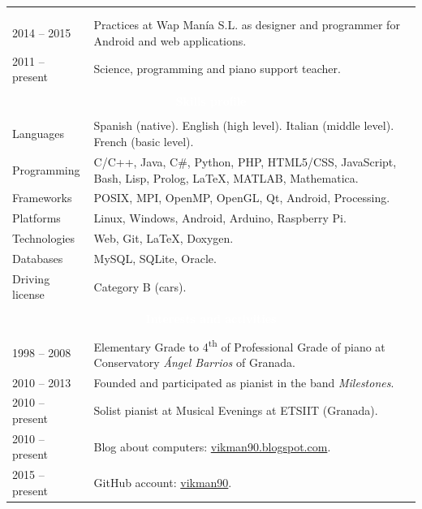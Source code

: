 \documentclass[12pt,a4paper]{article}
\newcommand{\header}[1]{\multicolumn{2}{c}{\cellcolor{black} \textcolor{white} {#1}} \\}
\begin{document}
\begin{longtable}{p{}p{}}
		\begin{tabular}{p{}p{}}
		\header{\textbf{Work experience}}
		\\
		2014 -- 2015 & Practices at Wap Manía S.L. as designer and programmer 
		for Android and web applications. \\	
		2011 -- present & Science, programming and piano support teacher. \\
		\\
		\header{\textbf{Skills profile}}
		\\
		Languages & Spanish (native). \newline
		English (high level). \newline
		Italian (middle level). \newline
		French (basic level). \\
		Programming & C/C++, Java, C\#, Python, PHP, HTML5/CSS, JavaScript, 
		Bash, Lisp, Prolog, LaTeX, MATLAB, Mathematica. \\
		Frameworks & POSIX, MPI, OpenMP, OpenGL, Qt, Android, Processing. \\
		Platforms & Linux, Windows, Android, Arduino, Raspberry Pi. \\
		Technologies & Web, Git, LaTeX, Doxygen. \\
		Databases & MySQL, SQLite, Oracle. \\
		Driving license & Category B (cars). \\
		\\
		\header{\textbf{Interests and activities}}
		\\
		1998 -- 2008 & Elementary Grade to 4\textsuperscript{th} of Professional
		Grade of piano at Conservatory \textit{Ángel Barrios} of Granada. \\
		2010 -- 2013 & Founded and participated as pianist in the band 
		\textit{Milestones}. \\
		2010 -- present & Solist pianist at Musical Evenings at ETSIIT (Granada). \\
		2010 -- present & Blog about computers: 
		\href{http://vikman90.blogspot.com}{vikman90.blogspot.com}. \\
		2015 -- present & GitHub account: 
		\href{https://github.com/vikman90}{vikman90}. \\
	\end{longtable}
\end{document}

